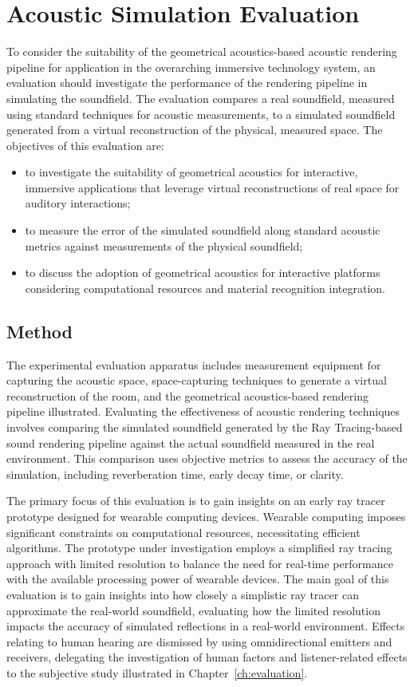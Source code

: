 \section{Acoustic Simulation Evaluation}
To consider the suitability of the geometrical acoustics-based acoustic rendering pipeline for application in the overarching immersive technology system, an evaluation should investigate the performance of the rendering pipeline in simulating the soundfield. The evaluation compares a real soundfield, measured using standard techniques for acoustic measurements, to a simulated soundfield generated from a virtual reconstruction of the physical, measured space. The objectives of this evaluation are:
\begin{itemize}
    \item to investigate the suitability of geometrical acoustics for interactive, immersive applications that leverage virtual reconstructions of real space for auditory interactions;
    \item to measure the error of the simulated soundfield along standard acoustic metrics against measurements of the physical soundfield;
    \item to discuss the adoption of geometrical acoustics for interactive platforms considering computational resources and material recognition integration.
\end{itemize}

\subsection{Method}
The experimental evaluation apparatus includes measurement equipment for capturing the acoustic space, space-capturing techniques to generate a virtual reconstruction of the room, and the geometrical acoustics-based rendering pipeline illustrated. Evaluating the effectiveness of acoustic rendering techniques involves comparing the simulated soundfield generated by the Ray Tracing-based sound rendering pipeline against the actual soundfield measured in the real environment. This comparison uses objective metrics to assess the accuracy of the simulation, including reverberation time, early decay time, or clarity.\par
The primary focus of this evaluation is to gain insights on an early ray tracer prototype designed for wearable computing devices. Wearable computing imposes significant constraints on computational resources, necessitating efficient algorithms. The prototype under investigation employs a simplified ray tracing approach with limited resolution to balance the need for real-time performance with the available processing power of wearable devices. The main goal of this evaluation is to gain insights into how closely a simplistic ray tracer can approximate the real-world soundfield, evaluating how the limited resolution impacts the accuracy of simulated reflections in a real-world environment. Effects relating to human hearing are dismissed by using omnidirectional emitters and receivers, delegating the investigation of human factors and listener-related effects to the subjective study illustrated in Chapter~\ref{ch:evaluation}.

